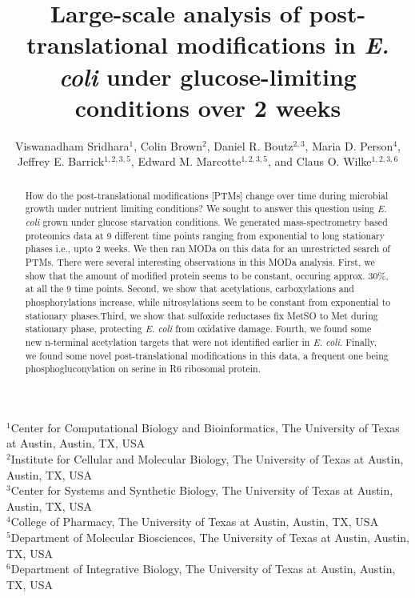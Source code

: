 \documentclass[12pt]{article}
\begin{document}
\title{Large-scale analysis of post-translational modifications in \emph{E. coli} under glucose-limiting conditions over 2 weeks}

\author{Viswanadham Sridhara$^1$, Colin Brown$^{2}$, Daniel R. Boutz$^{2,3}$, Maria D. Person$^{4}$,\\
Jeffrey E. Barrick$^{1,2,3,5}$, Edward M. Marcotte$^{1,2,3,5}$, and Claus O. Wilke$^{1,2,3,6}$}
\maketitle

\noindent
$^1$Center for Computational Biology and Bioinformatics, The University of Texas at Austin, Austin, TX, USA\\
$^2$Institute for Cellular and Molecular Biology, The University of Texas at Austin, Austin, TX, USA\\
$^3$Center for Systems and Synthetic Biology, The University of Texas at Austin, Austin, TX, USA\\
$^4$College of Pharmacy, The University of Texas at Austin, Austin, TX, USA\\
$^5$Department of Molecular Biosciences, The University of Texas at Austin, Austin, TX, USA\\
$^6$Department of Integrative Biology, The University of Texas at Austin, Austin, TX, USA\\


\begin{abstract}
How do the post-translational modifications [PTMs] change over time during microbial growth under nutrient limiting conditions? We sought to answer this question using \emph{E. coli} grown under glucose starvation conditions. We generated mass-spectrometry based proteomics data at 9 different time points ranging from exponential to long stationary phases i.e., upto 2 weeks. We then ran MODa on this data for an unrestricted search of PTMs. There were several interesting observations in this MODa analysis. First, we show that the amount of modified protein seems to be constant, occuring approx. 30\%, at all the 9 time points. Second, we show that acetylations, carboxylations and phosphorylations increase, while nitrosylations seem to be constant from exponential to stationary phases.Third, we show that sulfoxide reductases fix MetSO to Met during stationary phase, protecting \emph{E. coli} from oxidative damage. Fourth, we found some new n-terminal acetylation targets that were not identified earlier in \emph{E. coli}. Finally, we found some novel post-translational modifications in this data, a frequent one being phosphogluconylation on serine in R6 ribosomal protein.
\end{abstract}
\end{document}

